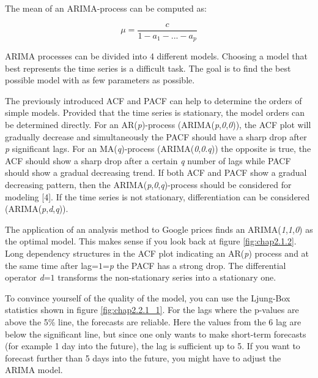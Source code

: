 \documentclass[
]{article}
\begin{document}
The mean of an ARIMA-process can be computed as:

\[\mu=\frac{c}{1-a_{1}-...-a_{p}}\]

ARIMA processes can be divided into 4 different models. Choosing a model
that best represents the time series is a difficult task. The goal is to
find the best possible model with as few parameters as possible.

The previously introduced ACF and PACF can help to determine the orders
of simple models. Provided that the time series is stationary, the model
orders can be determined directly. For an AR(\emph{p})-process
(ARIMA(\emph{p},\emph{0},\emph{0})), the ACF plot will gradually
decrease and simultaneously the PACF should have a sharp drop after
\emph{p} significant lags. For an MA(\emph{q})-process
(ARIMA(\emph{0},\emph{0}.\emph{q})) the opposite is true, the ACF should
show a sharp drop after a certain \emph{q} number of lags while PACF
should show a gradual decreasing trend. If both ACF and PACF show a
gradual decreasing pattern, then the
ARIMA(\emph{p},\emph{0},\emph{q})-process should be considered for
modeling {[}4{]}. If the time series is not stationary, differentiation
can be considered (ARIMA(\emph{p},\emph{d},\emph{q})).

\newpage

The application of an analysis method to Google prices finds an
ARIMA(\emph{1},\emph{1},\emph{0}) as the optimal model. This makes sense
if you look back at figure \ref{fig:chap2.1.2}. Long dependency
structures in the ACF plot indicating an AR(\emph{p}) process and at the
same time after lag=\(1\)=\emph{p} the PACF has a strong drop. The
differential operator \emph{d}=\(1\) transforms the non-stationary
series into a stationary one.

To convince yourself of the quality of the model, you can use the
Ljung-Box statistics shown in figure \ref{fig:chap2.2.1_1}. For the lags
where the p-values are above the 5\% line, the forecasts are reliable.
Here the values from the 6 lag are below the significant line, but since
one only wants to make short-term forecasts (for example 1 day into the
future), the lag is sufficient up to 5. If you want to forecast further
than 5 days into the future, you might have to adjust the ARIMA model.
\end{document}
